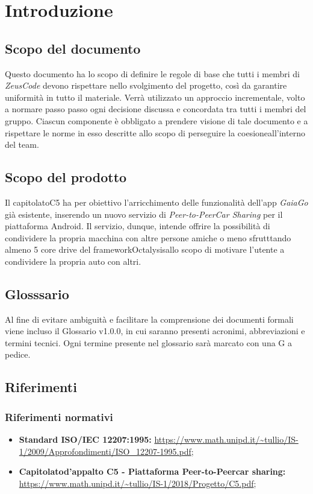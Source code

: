 \section {Introduzione}
\subsection {Scopo del documento}
Questo documento  ha lo scopo di definire le regole di base che tutti i membri di \textit{ZeusCode} devono rispettare nello svolgimento del progetto, così da garantire uniformità in tutto il materiale. Verrà utilizzato un approccio incrementale\glo, volto a normare passo passo ogni decisione discussa e concordata tra tutti i membri del gruppo. Ciascun componente è obbligato a prendere visione di tale documento e a rispettare le norme in esso descritte allo scopo di perseguire la coesione\glosp all'interno del team.
\subsection {Scopo del prodotto}
Il capitolato\glosp C5 ha per obiettivo l'arricchimento delle funzionalità dell'app \textit{GaiaGo} già esistente, inserendo un nuovo servizio di \textit{Peer-to-Peer\glosp Car Sharing} per il piattaforma Android.
Il servizio, dunque, intende offrire la possibilità di condividere la propria macchina con altre persone amiche o meno sfrutttando almeno 5 core drive del framework\glosp Octalysis\glosp allo scopo di motivare l'utente a condividere la propria auto con altri.
\subsection {Glosssario}
Al fine di evitare ambiguità e facilitare la comprensione dei documenti formali viene incluso il Glossario v1.0.0, in cui saranno presenti acronimi, abbreviazioni e termini tecnici. Ogni termine presente nel glossario sarà marcato con una G a pedice.
\subsection {Riferimenti}
\subsubsection {Riferimenti normativi}

\begin{itemize}
	\item  \textbf{Standard ISO/IEC 12207:1995:}\newline
	\url{https://www.math.unipd.it/~tullio/IS-1/2009/Approfondimenti/ISO_12207-1995.pdf};
	\item \textbf{Capitolato\glosp d'appalto C5 - Piattaforma Peer-to-Peer\glosp car sharing:}\newline 
	\url{https://www.math.unipd.it/~tullio/IS-1/2018/Progetto/C5.pdf};
\end{itemize}

